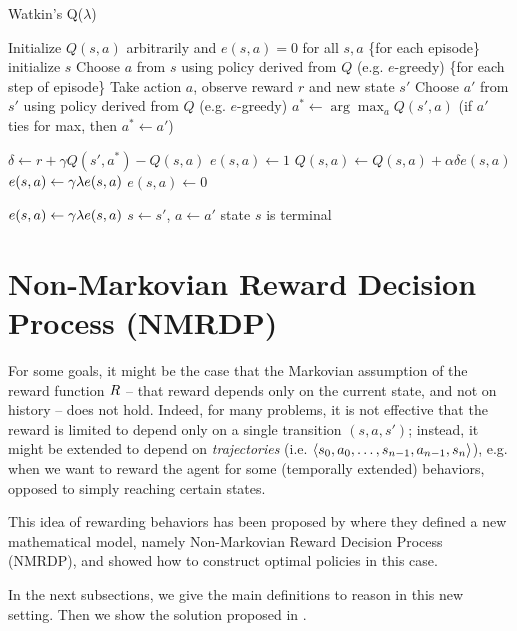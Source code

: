 \begin{algorithm}
	\caption{Watkin's Q($\lambda$) \citep{watkins1989learning}}
	\label{alg:q-learning-lambda}
	\begin{algorithmic}[1]
		\State Initialize $Q(s, a)$ arbitrarily and $e(s, a)=0$ for all $s, a$
		\Repeat \{for each episode\} 
			\State initialize $s$
			\State Choose $a$ from $s$ using  policy derived from $Q$ (e.g. $e$-greedy)
			\Repeat \{for each step of episode\}	
				\State Take action $a$, observe reward $r$ and new state $s'$
				\State Choose $a'$ from $s'$ using policy derived from $Q$ (e.g. $e$-greedy)
				\State $a^* \gets \arg\max_a Q(s', a)$ (if $a'$ ties for max, then $a^* \gets a'$)
				
				\State $\delta \gets r + \gamma Q(s', a^*) - Q(s, a)$
				\State $e(s, a) \gets 1$ \label{q-learning-lambda-replacing-traces}
					\State $Q(s, a) \gets Q(s, a) + \alpha\delta e(s, a)$
						\State $e(s, a) \gets \gamma\lambda e(s, a)$
					\Else 
						\State $e(s, a) \gets 0$
					\EndIf
					
					\State $e(s, a) \gets \gamma\lambda e(s, a)$
				\EndFor
				\State $s\gets s'$, $a \gets a'$
			\Until state $s$ is terminal
		\Until
	\end{algorithmic}
	
\end{algorithm}

\section{Non-Markovian Reward Decision Process (NMRDP)}\label{sect:NMRDP}
For some goals, it might be the case that the Markovian assumption of the reward function $R$ -- that reward depends only on the current state, and not on history -- does not hold. Indeed, for many problems, it is not effective that the reward is limited to depend only on a single transition $(s,a,s')$; instead, it might be extended to depend on \emph{trajectories} (i.e. $\langle s_0, a_0, \dots, s_{n-1}, a_{n-1}, s_n \rangle$), e.g. when we want to reward the agent for some (temporally  extended) behaviors, opposed to simply reaching certain states. 

This idea of rewarding behaviors has been proposed by \citep{bacchus1996rewarding} where they defined a new mathematical model, namely Non-Markovian Reward Decision Process (NMRDP), and showed how to construct optimal policies in this case.

In the next subsections, we give the main definitions to reason in this new setting. Then we show the solution proposed in \citep{bacchus1996rewarding}.

